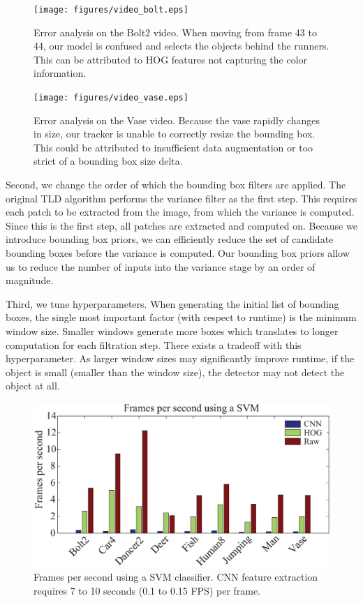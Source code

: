 \documentclass[10pt,twocolumn,letterpaper]{article}
\begin{document}
\begin{figure}
\vspace{-9mm}
	\texttt{[image: figures/video\_bolt.eps]}
	\caption{Error analysis on the Bolt2 video. When moving from frame 43 to 44, our model is confused and selects the objects behind the runners. This can be attributed to HOG features not capturing the color information.}
	\label{fig:bolt}
	\vspace{3mm}
	\texttt{[image: figures/video\_vase.eps]}
	\caption{Error analysis on the Vase video. Because the vase rapidly changes in size, our tracker is unable to correctly resize the bounding box. This could be attributed to insufficient data augmentation or too strict of a bounding box size delta.}
	\label{fig:vase}
\end{figure}

Second, we change the order of which the bounding box filters are applied. The original TLD algorithm performs the variance filter as the first step. This requires each patch to be extracted from the image, from which the variance is computed. Since this is the first step, all patches are extracted and computed on. Because we introduce bounding box priors, we can efficiently reduce the set of candidate bounding boxes before the variance is computed. Our bounding box priors allow us to reduce the number of inputs into the variance stage by an order of magnitude. 



Third, we tune hyperparameters. When generating the initial list of bounding boxes, the single most important factor (with respect to runtime) is the minimum window size. Smaller windows generate more boxes which translates to longer computation for each filtration step. There exists a tradeoff with this hyperparameter. As larger window sizes may significantly improve runtime, if the object is small (smaller than the window size), the detector may not detect the object at all.

\begin{figure}[t]
\centering
	\includegraphics[width=0.9\linewidth]{figures/runtime.eps}
	\caption{Frames per second using a SVM classifier. CNN feature extraction requires 7 to 10 seconds (0.1 to 0.15 FPS) per frame. }
	\label{fig:runtime}
	\vspace{-4mm}
\end{figure}
\end{document}
